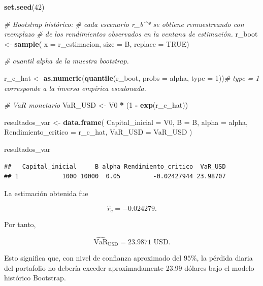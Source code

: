 \documentclass[
]{article}
\newenvironment{Shaded}{\begin{snugshade}}{\end{snugshade}}
\newcommand{\AttributeTok}[1]{\textcolor[rgb]{0.13,0.29,0.53}{#1}}
\newcommand{\CommentTok}[1]{\textcolor[rgb]{0.56,0.35,0.01}{\textit{#1}}}
\newcommand{\ConstantTok}[1]{\textcolor[rgb]{0.56,0.35,0.01}{#1}}
\newcommand{\DecValTok}[1]{\textcolor[rgb]{0.00,0.00,0.81}{#1}}
\newcommand{\FunctionTok}[1]{\textcolor[rgb]{0.13,0.29,0.53}{\textbf{#1}}}
\newcommand{\NormalTok}[1]{#1}
\newcommand{\OtherTok}[1]{\textcolor[rgb]{0.56,0.35,0.01}{#1}}
\newcommand{\SpecialCharTok}[1]{\textcolor[rgb]{0.81,0.36,0.00}{\textbf{#1}}}
\begin{document}
\begin{Shaded}
\begin{Highlighting}[]
\FunctionTok{set.seed}\NormalTok{(}\DecValTok{42}\NormalTok{)}

\CommentTok{\# Bootstrap histórico:}
\CommentTok{\# cada escenario r\_b\^{}* se obtiene remuestreando con reemplazo}
\CommentTok{\# de los rendimientos observados en la ventana de estimación.}
\NormalTok{r\_boot }\OtherTok{\textless{}{-}} \FunctionTok{sample}\NormalTok{( }\AttributeTok{x =}\NormalTok{ r\_estimacion, }\AttributeTok{size =}\NormalTok{ B, }\AttributeTok{replace =} \ConstantTok{TRUE}\NormalTok{)}

\CommentTok{\#  cuantil alpha de la muestra bootstrap.}

\NormalTok{r\_c\_hat }\OtherTok{\textless{}{-}} \FunctionTok{as.numeric}\NormalTok{(}\FunctionTok{quantile}\NormalTok{(r\_boot, }\AttributeTok{probs =}\NormalTok{ alpha, }\AttributeTok{type =} \DecValTok{1}\NormalTok{))}\CommentTok{\# type = 1 corresponde a la inversa empírica escalonada.}

\CommentTok{\# VaR monetario}
\NormalTok{VaR\_USD }\OtherTok{\textless{}{-}}\NormalTok{ V0 }\SpecialCharTok{*}\NormalTok{ (}\DecValTok{1} \SpecialCharTok{{-}} \FunctionTok{exp}\NormalTok{(r\_c\_hat))}

\NormalTok{resultados\_var }\OtherTok{\textless{}{-}} \FunctionTok{data.frame}\NormalTok{(}
  \AttributeTok{Capital\_inicial =}\NormalTok{ V0,}
  \AttributeTok{B =}\NormalTok{ B,}
  \AttributeTok{alpha =}\NormalTok{ alpha,}
  \AttributeTok{Rendimiento\_critico =}\NormalTok{ r\_c\_hat,}
  \AttributeTok{VaR\_USD =}\NormalTok{ VaR\_USD}
\NormalTok{)}

\NormalTok{resultados\_var}
\end{Highlighting}
\end{Shaded}

\begin{verbatim}
##   Capital_inicial     B alpha Rendimiento_critico  VaR_USD
## 1            1000 10000  0.05         -0.02427944 23.98707
\end{verbatim}

La estimación obtenida fue

\[
\widehat r_c =
-0.024279.
\]

Por tanto,

\[
\widehat{\text{VaR}}_{\text{USD}}
=
23.9871
\text{ USD}.
\]

Esto significa que, con nivel de confianza aproximado del \(95\%\), la
pérdida diaria del portafolio no debería exceder aproximadamente 23.99
dólares bajo el modelo histórico Bootstrap.
\end{document}
